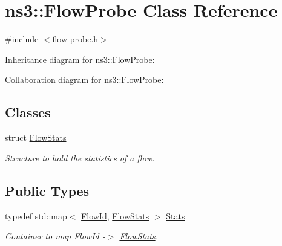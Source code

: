 \hypertarget{classns3_1_1FlowProbe}{}\section{ns3\+:\+:Flow\+Probe Class Reference}
\label{classns3_1_1FlowProbe}


{\ttfamily \#include $<$flow-\/probe.\+h$>$}



Inheritance diagram for ns3\+:\+:Flow\+Probe\+:


Collaboration diagram for ns3\+:\+:Flow\+Probe\+:
\subsection*{Classes}
\begin{DoxyCompactItemize}
\item 
struct \hyperlink{structns3_1_1FlowProbe_1_1FlowStats}{Flow\+Stats}
\begin{DoxyCompactList}\small\item\em Structure to hold the statistics of a flow. \end{DoxyCompactList}\end{DoxyCompactItemize}
\subsection*{Public Types}
\begin{DoxyCompactItemize}
\item 
typedef std\+::map$<$ \hyperlink{group__flow-monitor_ga39a766c4a370cdb9ab8ac85da4b288e9}{Flow\+Id}, \hyperlink{structns3_1_1FlowProbe_1_1FlowStats}{Flow\+Stats} $>$ \hyperlink{classns3_1_1FlowProbe_a6e09fdef49c914b417bcea3bfb4ca53d}{Stats}
\begin{DoxyCompactList}\small\item\em Container to map Flow\+Id -\/$>$ \hyperlink{structns3_1_1FlowProbe_1_1FlowStats}{Flow\+Stats}. \end{DoxyCompactList}\end{DoxyCompactItemize}
